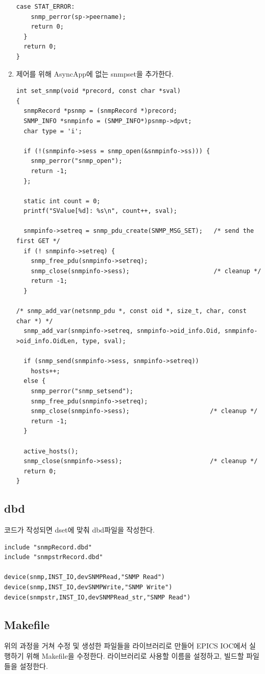 \documentclass[11pt
  , a4paper
  , article
  , oneside
]{memoir}
\begin{document}
\begin{enumerate}
\begin{lstlisting}[style=termstyle]
  case STAT_ERROR:
    snmp_perror(sp->peername);
    return 0;
  }
  return 0;
}
\end{lstlisting}

\item 제어를 위해 AsyncApp에 없는 snmpset을 추가한다.

\begin{lstlisting}[style=termstyle]
int set_snmp(void *precord, const char *sval)
{
  snmpRecord *psnmp = (snmpRecord *)precord;
  SNMP_INFO *snmpinfo = (SNMP_INFO*)psnmp->dpvt;
  char type = 'i';

  if (!(snmpinfo->sess = snmp_open(&snmpinfo->ss))) {
    snmp_perror("snmp_open");
    return -1;
  };
  
  static int count = 0;
  printf("SValue[%d]: %s\n", count++, sval);

  snmpinfo->setreq = snmp_pdu_create(SNMP_MSG_SET);   /* send the first GET */
  if (! snmpinfo->setreq) {
    snmp_free_pdu(snmpinfo->setreq);
    snmp_close(snmpinfo->sess);                       /* cleanup */
    return -1;
  }
  
/* snmp_add_var(netsnmp_pdu *, const oid *, size_t, char, const char *) */
  snmp_add_var(snmpinfo->setreq, snmpinfo->oid_info.Oid, snmpinfo->oid_info.OidLen, type, sval);       

  if (snmp_send(snmpinfo->sess, snmpinfo->setreq))
    hosts++;
  else {
    snmp_perror("snmp_setsend");
    snmp_free_pdu(snmpinfo->setreq);
    snmp_close(snmpinfo->sess);                      /* cleanup */
    return -1;
  }

  active_hosts();
  snmp_close(snmpinfo->sess);                        /* cleanup */
  return 0;
}
\end{lstlisting}
\end{enumerate}

\subsection{dbd}
코드가 작성되면 dset에 맞춰 dbd파일을 작성한다.


\begin{lstlisting}[style=termstyle]
include "snmpRecord.dbd"
include "snmpstrRecord.dbd"

device(snmp,INST_IO,devSNMPRead,"SNMP Read")
device(snmp,INST_IO,devSNMPWrite,"SNMP Write")
device(snmpstr,INST_IO,devSNMPRead_str,"SNMP Read")
\end{lstlisting}

\subsection{Makefile}
위의 과정을 거쳐 수정 및 생성한 파일들을 라이브러리로 만들어 EPICS IOC에서 실행하기 위해 Makefile을 수정한다. 라이브러리로 사용할 이름을 설정하고, 빌드할 파일들을 설정한다.
\end{document}
